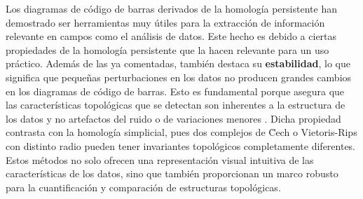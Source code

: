 %

Los diagramas de código de barras derivados de la homología persistente han demostrado ser herramientas muy útiles para la extracción de información relevante en campos como el análisis de datos. Este hecho es debido a ciertas propiedades de la homología persistente que la hacen relevante para un uso práctico. Además de las ya comentadas, también destaca su \textbf{estabilidad}, lo que significa que pequeñas perturbaciones en los datos no producen grandes cambios en los diagramas de código de barras. Esto es fundamental porque asegura que las características topológicas que se detectan son inherentes a la estructura de los datos y no artefactos del ruido o de variaciones menores \cite{cohen2005stability, chazal2016structure}. Dicha propiedad contrasta con la homología simplicial, pues dos complejos de \u Cech o Vietoris-Rips con distinto radio pueden tener invariantes topológicos completamente diferentes. Estos métodos no solo ofrecen una representación visual intuitiva de las características de los datos, sino que también proporcionan un marco robusto para la cuantificación y comparación de estructuras topológicas.

\endinput
